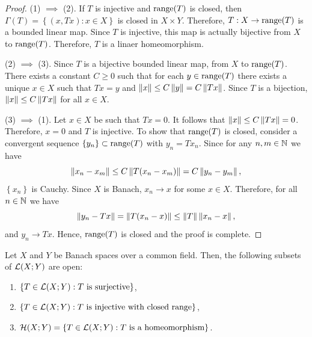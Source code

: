\documentclass[a4paper]{article}
\begin{document}
\begin{proof}
  (1) $\implies$ (2). If $T$ is injective and $\operatorname{range}(T)$ is closed,
  then $\Gamma(T) = \left\{ (x, Tx) : x \in X \right\}$ is closed in
  $X \times Y$. Therefore, $T : X \to \operatorname{range} (T)$ is a bounded linear
  map. Since $T$ is injective, this map is actually bijective from
  $X$ to $\operatorname{range} (T)$. Therefore, $T$ is a linaer homeomorphism.

  (2) $\implies$ (3). Since $T$ is a bijective bounded linear map,
  from $X$ to $\operatorname{range}(T)$. There exists a constant $C \geq 0$
  such that for each $y \in \operatorname{range}(T)$ there exists
  a unique $x \in X$ such that $T x = y$ and $\left\lVert x\right\rVert \leq
    C \left\lVert y\right\rVert = C \left\lVert T x\right\rVert$. Since $T$ is a bijection,
  $\left\lVert x\right\rVert \leq C \left\lVert T x\right\rVert$ for all $x \in X$.

  (3) $\implies$ (1). Let $x \in X$ be such that $T x = 0$.
  It follows that $\left\lVert x\right\rVert \leq C \left\lVert T x\right\rVert = 0$. Therefore,
  $x = 0$ and $T$ is injective. To show that
  $\operatorname{range}(T)$ is closed, consider a convergent sequence
  $\left\{ y_n \right\} \subset \operatorname{range}(T)$ with
  $y_n = T x_n$. Since for any $n, m \in \mathbb{N}$ we have
  \[
    \left\lVert x_n - x_m\right\rVert \leq C \left\lVert T (x_n - x_m)\right\rVert = C \left\lVert y_n - y_m\right\rVert,
  \]
  $\left\{ x_n \right\}$ is Cauchy. Since $X$ is Banach,
  $x_n \to x$ for some $x \in X$. Therefore, for
  all $n \in \mathbb{N}$ we have
  \[
    \left\lVert y_n - T x\right\rVert = \left\lVert T (x_n - x)\right\rVert \leq \left\lVert T\right\rVert \left\lVert x_n - x\right\rVert,
  \]
  and $y_n \to T x$. Hence, $\operatorname{range}(T)$ is closed and the proof is complete.

\end{proof}

\begin{thm}
  Let $X$ and $Y$ be Banach spaces over a common field. Then, the
  following subsets of $\mathcal{L}(X; Y)$ are open:
  \begin{enumerate}
    \item $\left\{ T \in \mathcal{L}(X; Y) : \text{$T$ is surjective} \right\}$,
    \item $\left\{ T \in \mathcal{L}(X; Y) : \text{$T$ is injective with closed range} \right\}$,
    \item $\mathcal{H}(X; Y) = \left\{ T \in \mathcal{L}(X; Y) : \text{$T$ is a homeomorphism} \right\}$.
  \end{enumerate}
\end{thm}
\end{document}
